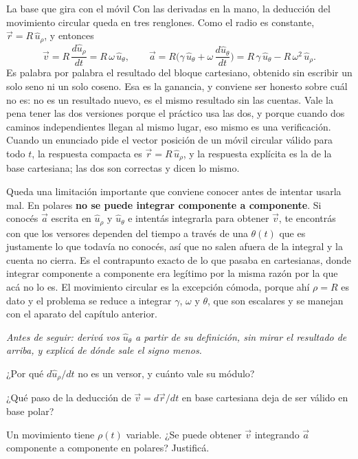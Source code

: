 \documentclass[11pt,openany]{book}
\begin{document}
\begin{bloque}{La base que gira con el móvil}
Con las derivadas en la mano, la deducción del movimiento circular queda en tres renglones. Como el radio es constante, $\vec r = R\,\hat u_\rho$, y entonces
\[
\vec v = R\,\frac{d\hat u_\rho}{dt} = R\,\omega\,\hat u_\theta,
\qquad
\vec a = R\Big(\gamma\,\hat u_\theta + \omega\,\frac{d\hat u_\theta}{dt}\Big) = R\,\gamma\,\hat u_\theta - R\,\omega^2\,\hat u_\rho.
\]
Es palabra por palabra el resultado del bloque cartesiano, obtenido sin escribir un solo seno ni un solo coseno. Esa es la ganancia, y conviene ser honesto sobre cuál no es: no es un resultado nuevo, es el mismo resultado sin las cuentas. Vale la pena tener las dos versiones porque el práctico usa las dos, y porque cuando dos caminos independientes llegan al mismo lugar, eso mismo es una verificación. Cuando un enunciado pide el vector posición de un móvil circular válido para todo $t$, la respuesta compacta es $\vec r = R\,\hat u_\rho$, y la respuesta explícita es la de la base cartesiana; las dos son correctas y dicen lo mismo.

Queda una limitación importante que conviene conocer antes de intentar usarla mal. En polares \textbf{no se puede integrar componente a componente}. Si conocés $\vec a$ escrita en $\hat u_\rho$ y $\hat u_\theta$ e intentás integrarla para obtener $\vec v$, te encontrás con que los versores dependen del tiempo a través de una $\theta(t)$ que es justamente lo que todavía no conocés, así que no salen afuera de la integral y la cuenta no cierra. Es el contrapunto exacto de lo que pasaba en cartesianas, donde integrar componente a componente era legítimo por la misma razón por la que acá no lo es. El movimiento circular es la excepción cómoda, porque ahí $\rho = R$ es dato y el problema se reduce a integrar $\gamma$, $\omega$ y $\theta$, que son escalares y se manejan con el aparato del capítulo anterior.

\textit{Antes de seguir: derivá vos $\hat u_\theta$ a partir de su definición, sin mirar el resultado de arriba, y explicá de dónde sale el signo menos.}
\end{bloque}

\begin{chequeo}
\item ¿Por qué $d\hat u_\rho/dt$ no es un versor, y cuánto vale su módulo?
\item ¿Qué paso de la deducción de $\vec v = d\vec r/dt$ en base cartesiana deja de ser válido en base polar?
\item Un movimiento tiene $\rho(t)$ variable. ¿Se puede obtener $\vec v$ integrando $\vec a$ componente a componente en polares? Justificá.
\end{chequeo}
\end{document}
